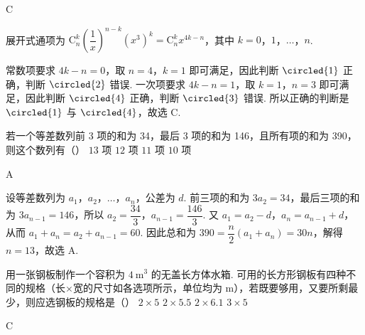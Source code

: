\begin{answer}
C
\end{answer}

\begin{solution}
展开式通项为 \(\mathrm C_{n}^{k}\left(\dfrac{1}{x}\right)^{n-k}\left(x^{3}\right)^{k}=\mathrm C_{n}^{k}x^{4k-n}\)，其中 \(k=0\)，\(1\)，\(\ldots\)，\(n\).

常数项要求 \(4k-n=0\)，取 \(n=4\)，\(k=1\) 即可满足，因此判断 \(\circled{1}\) 正确，判断 \(\circled{2}\) 错误. 一次项要求 \(4k-n=1\)，取 \(k=1\)，\(n=3\) 即可满足，因此判断 \(\circled{4}\) 正确，判断 \(\circled{3}\) 错误. 所以正确的判断是 \(\circled{1}\) 与 \(\circled{4}\)，故选 C.
\end{solution}

\begin{problem}
若一个等差数列前 3 项的和为 34，最后 3 项的和为 146，且所有项的和为 390，则这个数列有（\quad）
\choices
    {\(13\) 项}
    {\(12\) 项}
    {\(11\) 项}
    {\(10\) 项}

\end{problem}

\begin{answer}
A
\end{answer}

\begin{solution}
设等差数列为 \(a_{1}\)，\(a_{2}\)，\(\ldots\)，\(a_{n}\)，公差为 \(d\). 前三项的和为 \(3a_{2}=34\)，最后三项的和为 \(3a_{n-1}=146\)，所以 \(a_{2}=\dfrac{34}{3}\)，\(a_{n-1}=\dfrac{146}{3}\). 又 \(a_{1}=a_{2}-d\)，\(a_{n}=a_{n-1}+d\)，从而 \(a_{1}+a_{n}=a_{2}+a_{n-1}=60\). 因此总和为 \(390=\dfrac{n}{2}(a_{1}+a_{n})=30n\)，解得 \(n=13\)，故选 A.
\end{solution}

\begin{problem}
用一张钢板制作一个容积为 \(4\mathrm{~m}^{3}\) 的无盖长方体水箱. 可用的长方形钢板有四种不同的规格（长\(\times\)宽的尺寸如各选项所示，单位均为 \(\mathrm{m}\)），若既要够用，又要所剩最少，则应选钢板的规格是（\quad）
\choices
    {\(2\times5\)}
    {\(2\times5.5\)}
    {\(2\times6.1\)}
    {\(3\times5\)}
\end{problem}

\begin{answer}
C
\end{answer}

